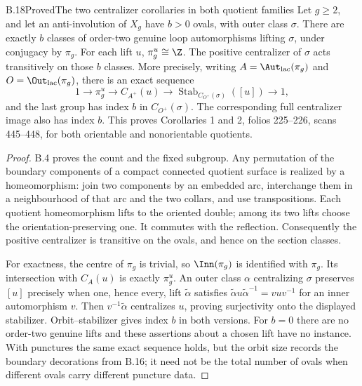 \begin{claim}{B.18}{Proved}{The two centralizer corollaries in both quotient families}
Let $g\ge2$, and let an anti-involution of $X_g$ have $b>0$ ovals, with outer
class $\sigma$. There are exactly $b$ classes of order-two genuine
loop automorphisms lifting $\sigma$, under conjugacy by $\pi_g$.
For each lift $u$, $\pi_g^u\cong\Z$. The positive centralizer of $\sigma$ acts
transitively on those $b$ classes. More precisely, writing
$A=\Aut_{\rm lac}(\pi_g)$ and $O=\Out_{\rm lac}(\pi_g)$, there is an exact sequence
\[
 1\longrightarrow\pi_g^u\longrightarrow C_{A^+}(u)
 \longrightarrow\operatorname{Stab}_{C_{O^+}(\sigma)}([u])\longrightarrow1,
\]
and the last group has index $b$ in $C_{O^+}(\sigma)$. The corresponding full
centralizer image also has index $b$. This proves Corollaries 1 and 2,
folios 225--226, scans 445--448, for both orientable and nonorientable quotients.
\end{claim}
\begin{proof}
B.4 proves the count and the fixed subgroup. Any permutation of the boundary
components of a compact connected quotient surface is realized by a homeomorphism:
join two components by an embedded arc, interchange them in a neighbourhood of
that arc and the two collars, and use transpositions. Each quotient homeomorphism
lifts to the oriented double; among its two lifts choose the orientation-preserving
one. It commutes with the reflection. Consequently the positive centralizer is
transitive on the ovals, and hence on the section classes.

For exactness, the centre of $\pi_g$ is trivial, so $\Inn(\pi_g)$ is identified
with $\pi_g$. Its intersection with $C_A(u)$ is exactly $\pi_g^u$.
An outer class $\alpha$ centralizing $\sigma$ preserves $[u]$ precisely when
one, hence every, lift $\widetilde\alpha$ satisfies
$\widetilde\alpha u\widetilde\alpha^{-1}=vuv^{-1}$ for an inner automorphism
$v$. Then $v^{-1}\widetilde\alpha$ centralizes $u$, proving surjectivity onto
the displayed stabilizer. Orbit--stabilizer gives index $b$ in both versions.
For $b=0$ there are no order-two genuine lifts and these assertions about a
chosen lift have no instance. With punctures the same exact sequence holds,
but the orbit size records the boundary decorations from B.16; it need not be
the total number of ovals when different ovals carry different puncture data.
\end{proof}

